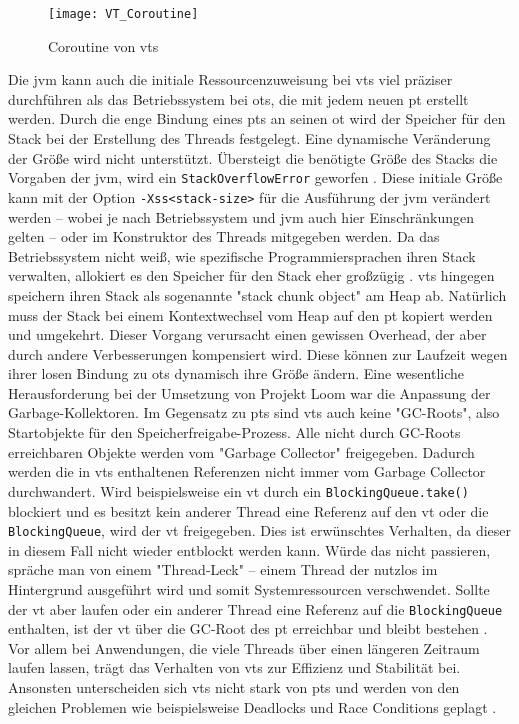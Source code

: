     \begin{figure}[H]
        \centering
        \texttt{[image: VT\_Coroutine]}
        \caption{Coroutine von \Glspl{vt}}
        \label{fig:VT_Coroutine}
    \end{figure}

    Die \gls{jvm} kann auch die initiale Ressourcenzuweisung bei \Glspl{vt} viel präziser durchführen als das Betriebssystem bei \Glspl{ot}, die mit jedem neuen \gls{pt}
    erstellt werden. Durch die enge Bindung eines \Glspl{pt} an seinen \gls{ot} wird der Speicher für den Stack bei der Erstellung des Threads festgelegt.
    Eine dynamische Veränderung der Größe wird nicht unterstützt. Übersteigt die benötigte Größe des Stacks die Vorgaben der \gls{jvm}, wird ein \texttt{StackOverflowError}
    geworfen \cite{jvmSpecification}. Diese initiale Größe kann mit der Option \texttt{-Xss<stack-size>} für die Ausführung der \gls{jvm} verändert werden -- wobei 
    je nach Betriebssystem und \gls{jvm} auch hier Einschränkungen gelten -- oder im Konstruktor des Threads mitgegeben werden.
    Da das Betriebssystem nicht weiß, wie spezifische Programmiersprachen ihren Stack verwalten, allokiert
    es den Speicher für den Stack eher großzügig \cite{ProjectLoom}.
    \Glspl{vt} hingegen speichern ihren Stack als sogenannte "stack chunk object" am Heap ab. Natürlich muss der Stack bei einem Kontextwechsel vom Heap auf den \gls{pt} kopiert werden und umgekehrt. Dieser
    Vorgang verursacht einen gewissen Overhead, der aber durch andere Verbesserungen kompensiert wird.
    Diese können zur Laufzeit wegen ihrer losen Bindung zu \Glspl{ot}
    dynamisch ihre Größe ändern. Eine wesentliche Herausforderung bei der Umsetzung von Projekt Loom war die Anpassung der Garbage-Kollektoren.
    Im Gegensatz zu \Glspl{pt} sind \Glspl{vt} auch keine "GC-Roots", also Startobjekte für den Speicherfreigabe-Prozess. Alle nicht durch GC-Roots erreichbaren
    Objekte werden vom "Garbage Collector" freigegeben. Dadurch werden die in \Glspl{vt} enthaltenen
    Referenzen nicht immer vom Garbage Collector durchwandert. Wird beispielsweise ein \gls{vt} durch ein \texttt{BlockingQueue.take()} blockiert und es besitzt kein anderer Thread eine
    Referenz auf den \gls{vt} oder die \texttt{BlockingQueue}, wird der \gls{vt} freigegeben. Dies ist erwünschtes Verhalten, da dieser in diesem Fall 
    nicht wieder entblockt werden kann. Würde das nicht passieren, spräche man von einem "Thread-Leck" -- einem Thread der nutzlos im Hintergrund ausgeführt wird und somit
    Systemressourcen verschwendet. 
    Sollte der \gls{vt} aber laufen oder ein anderer Thread eine Referenz auf die \texttt{BlockingQueue} enthalten, ist der 
    \gls{vt} über die GC-Root des \gls{pt} erreichbar und bleibt bestehen \cite{JEP425}.
    Vor allem bei Anwendungen, die viele Threads über einen längeren Zeitraum  laufen lassen, trägt das Verhalten von \Glspl{vt} zur Effizienz und Stabilität bei.
    Ansonsten unterscheiden sich \Glspl{vt} nicht stark von \Glspl{pt} und werden von den gleichen Problemen  wie beispielsweise Deadlocks und Race Conditions geplagt \cite{JEP425}.

